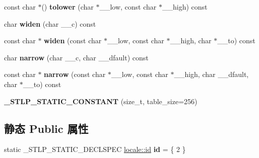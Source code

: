 \begin{DoxyCompactItemize}
\item 
\mbox{\label{classctype_3_01char_01_4_a3e2e5c38ab2cb0a5fe52acce9b6665cd}} 
const char $\ast$() {\bfseries tolower} (char $\ast$\+\_\+\+\_\+low, const char $\ast$\+\_\+\+\_\+high) const
\item 
\mbox{\label{classctype_3_01char_01_4_ac92ffa5d0f9b8870a731ce757f0a5140}} 
char {\bfseries widen} (char \+\_\+\+\_\+c) const
\item 
\mbox{\label{classctype_3_01char_01_4_a18fd71fb1e0f1ac2f391f879b58b5965}} 
const char $\ast$ {\bfseries widen} (const char $\ast$\+\_\+\+\_\+low, const char $\ast$\+\_\+\+\_\+high, char $\ast$\+\_\+\+\_\+to) const
\item 
\mbox{\label{classctype_3_01char_01_4_aaab2b2f3a7431342322e622f67194438}} 
char {\bfseries narrow} (char \+\_\+\+\_\+c, char \+\_\+\+\_\+dfault) const
\item 
\mbox{\label{classctype_3_01char_01_4_a972d51a0fe2ff5db74250473e8af6720}} 
const char $\ast$ {\bfseries narrow} (const char $\ast$\+\_\+\+\_\+low, const char $\ast$\+\_\+\+\_\+high, char \+\_\+\+\_\+dfault, char $\ast$\+\_\+\+\_\+to) const
\item 
\mbox{\label{classctype_3_01char_01_4_ac2a985dcfa79f54620dd22ace15dcd1e}} 
{\bfseries \+\_\+\+S\+T\+L\+P\+\_\+\+S\+T\+A\+T\+I\+C\+\_\+\+C\+O\+N\+S\+T\+A\+NT} (size\+\_\+t, table\+\_\+size=256)
\end{DoxyCompactItemize}
\subsection*{静态 Public 属性}
\begin{DoxyCompactItemize}
\item 
\mbox{\label{classctype_3_01char_01_4_ac32172f2cbec66cfaa76ce7c1077599b}} 
static \+\_\+\+S\+T\+L\+P\+\_\+\+S\+T\+A\+T\+I\+C\+\_\+\+D\+E\+C\+L\+S\+P\+EC \hyperlink{classlocale_1_1id}{locale\+::id} {\bfseries id} = \{ 2 \}
\end{DoxyCompactItemize}

